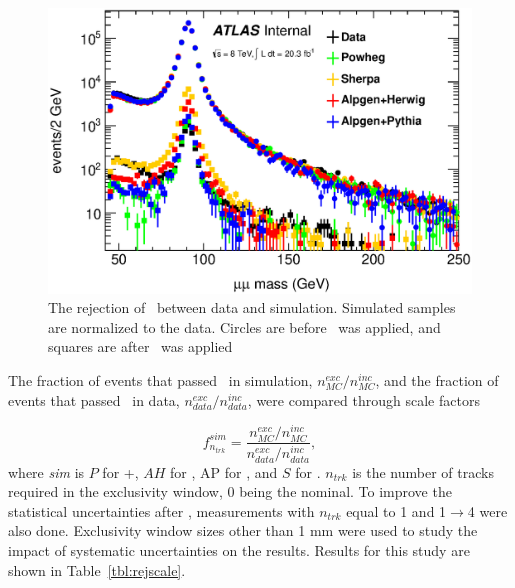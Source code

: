 \begin{figure}[!h]
\centering
\includegraphics[width=0.8\linewidth]{figures/zrejcal.eps}
\caption{The rejection of \Zmm\ between data and simulation. Simulated samples are normalized to the
data. Circles are before \DZ\ was applied, and squares are after \DZ\ was applied}
\label{fig:zsubcut}
\end{figure}

\par The fraction of events that passed \DZ\ in simulation, $n^{exc}_{MC}/n^{inc}_{MC}$, and the fraction of events 
that passed \DZ\ in data, $n^{exc}_{data}/n^{inc}_{data}$, were compared through scale factors   

\begin{equation}
f^{sim}_{n_{trk}} = \frac{n^{exc}_{MC}/n^{inc}_{MC}}{n^{exc}_{data}/n^{inc}_{data}}, 
\label{eqn:rsf}
\end{equation}
where {\it sim} is $P$ for \POWHEG+\PYTHIAeight, $AH$ for \AlpgenHerwig, AP for \AlpgenPythiaSix,
and $S$ for \SHERPA. $n_{trk}$ is the number of tracks required in the exclusivity window, 0 
being the nominal. To improve the statistical uncertainties after \DZ, measurements with $n_{trk}$ equal 
to 1 and 1$\to$4 were also done. Exclusivity window sizes other than 1 mm were used to study 
the impact of systematic uncertainties on the results. Results for this study are shown in 
Table~\ref{tbl:rejscale}.  

